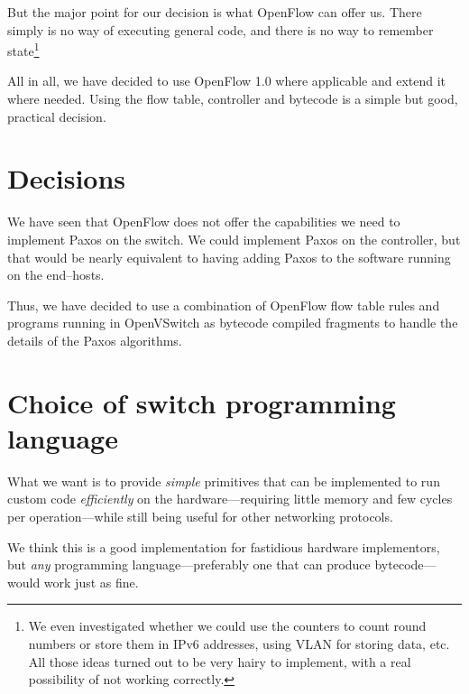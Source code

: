 But the major point for our decision is what OpenFlow can offer us.
There simply is no way of executing general code, and there is no way to
remember state\footnote{We even investigated whether we could use the
counters to count round numbers or store them in IPv6 addresses, using VLAN
for storing data, etc.  All those ideas turned out to be very hairy to
implement, with a real possibility of not working correctly.}

All in all, we have decided to use OpenFlow 1.0 where applicable and extend
it where needed.  Using the flow table, controller and bytecode is a simple
but good, practical decision.

\section{Decisions}

We have seen that OpenFlow does not offer the capabilities we need to
implement Paxos on the switch.  We could implement Paxos on the controller,
but that would be nearly equivalent to having adding Paxos to the software
running on the end--hosts.

Thus, we have decided to use a combination of OpenFlow flow table rules and
programs running in OpenVSwitch as bytecode compiled fragments to handle the
details of the Paxos algorithms.


\section{Choice of switch programming language}


What we want is to provide \textit{simple} primitives that can be
implemented to run custom code \textit{efficiently} on the
hardware---requiring little memory and few cycles per operation---while
still being useful for other networking protocols.

We think this is a good implementation for fastidious hardware implementors,
but \textit{any} programming language---preferably one that can produce
bytecode---would work just as fine.


